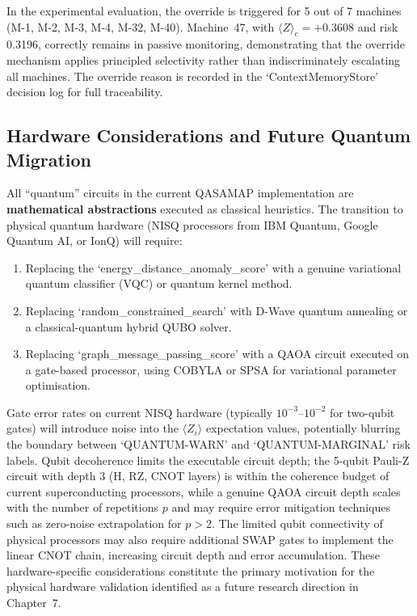 In the experimental evaluation, the override is triggered for 5 out of 7 machines (M-1, M-2, M-3, M-4, M-32, M-40). Machine~47, with $\langle Z \rangle_c = +0.3608$ and risk 0.3196, correctly remains in passive monitoring, demonstrating that the override mechanism applies principled selectivity rather than indiscriminately escalating all machines. The override reason is recorded in the `ContextMemoryStore' decision log for full traceability.

\subsection{Hardware Considerations and Future Quantum Migration}

All ``quantum'' circuits in the current QASAMAP implementation are \textbf{mathematical abstractions} executed as classical heuristics. The transition to physical quantum hardware (NISQ processors from IBM Quantum, Google Quantum AI, or IonQ) will require:
\begin{enumerate}
    \item Replacing the `energy_distance_anomaly_score' with a genuine variational quantum classifier (VQC) or quantum kernel method.
    \item Replacing `random_constrained_search' with D-Wave quantum annealing or a classical-quantum hybrid QUBO solver.
    \item Replacing `graph_message_passing_score' with a QAOA circuit executed on a gate-based processor, using COBYLA or SPSA for variational parameter optimisation.
\end{enumerate}

Gate error rates on current NISQ hardware (typically $10^{-3}$--$10^{-2}$ for two-qubit gates) will introduce noise into the $\langle Z_i \rangle$ expectation values, potentially blurring the boundary between `QUANTUM-WARN' and `QUANTUM-MARGINAL' risk labels. Qubit decoherence limits the executable circuit depth; the 5-qubit Pauli-Z circuit with depth 3 (H, RZ, CNOT layers) is within the coherence budget of current superconducting processors, while a genuine QAOA circuit depth scales with the number of repetitions $p$ and may require error mitigation techniques such as zero-noise extrapolation for $p > 2$. The limited qubit connectivity of physical processors may also require additional SWAP gates to implement the linear CNOT chain, increasing circuit depth and error accumulation. These hardware-specific considerations constitute the primary motivation for the physical hardware validation identified as a future research direction in Chapter~7.
